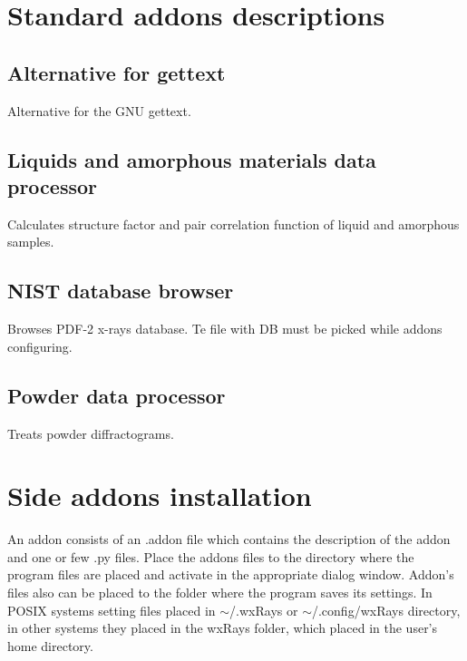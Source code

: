 \documentclass[a4paper,12pt]{article}
\begin{document}
\section{Standard addons descriptions}

\subsection{Alternative for gettext}
Alternative for the GNU gettext. 

\subsection{Liquids and amorphous materials data processor}
Calculates structure factor and pair correlation function of liquid and amorphous samples.

\subsection{NIST database browser}
Browses PDF-2 x-rays database. Te file with DB must be picked while addons configuring.

\subsection{Powder data processor}
Treats powder diffractograms.

\section{Side addons installation}
An addon consists of an {\ttfamily *.addon} file which contains the description of the addon and one or few {\ttfamily *.py} files. Place the addons files to the directory where the program files are placed and activate in the appropriate dialog window. Addon's files also can be placed to the folder where the program saves its settings. In POSIX systems setting files placed in \mbox{\ttfamily $\sim$/.wxRays} or \mbox{\ttfamily $\sim$/.config/wxRays} directory, in other systems they placed in the {\ttfamily wxRays} folder, which placed in the user's home directory.
\end{document}
